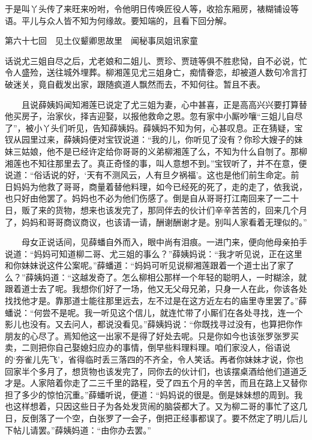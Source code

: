于是叫丫头传了来旺来吩咐，令他明日传唤匠役人等，收拾东厢房，裱糊铺设等语。平儿与众人皆不知为何缘故。要知端的，且看下回分解。


第六十七回　见土仪颦卿思故里　闻秘事凤姐讯家童


话说尤三姐自尽之后，尤老娘和二姐儿、贾珍、贾琏等俱不胜悲恸，自不必说，忙令人盛殓，送往城外埋葬。柳湘莲见尤三姐身亡，痴情眷恋，却被道人数句冷言打破迷关，竟自截发出家，跟随疯道人飘然而去，不知何往。暂且不表。

　　且说薛姨妈闻知湘莲已说定了尤三姐为妻，心中甚喜，正是高高兴兴要打算替他买房子，治家伙，择吉迎娶，以报他救命之恩。忽有家中小厮吵嚷“三姐儿自尽了”，被小丫头们听见，告知薛姨妈。薛姨妈不知为何，心甚叹息。正在猜疑，宝钗从园里过来，薛姨妈便对宝钗说道：“我的儿，你听见了没有？你珍大嫂子的妹妹三姑娘，他不是已经许定给你哥哥的义弟柳湘莲了么，不知为什么自刎了。那柳湘莲也不知往那里去了。真正奇怪的事，叫人意想不到。”宝钗听了，并不在意，便说道：“俗话说的好，‘天有不测风云，人有旦夕祸福’。这也是他们前生命定。前日妈妈为他救了哥哥，商量着替他料理，如今已经死的死了，走的走了，依我说，也只好由他罢了。妈妈也不必为他们伤感了。倒是自从哥哥打江南回来了一二十日，贩了来的货物，想来也该发完了，那同伴去的伙计们辛辛苦苦的，回来几个月了，妈妈和哥哥商议商议，也该请一请，酬谢酬谢才是。别叫人家看着无理似的。”

　　母女正说话间，见薛蟠自外而入，眼中尚有泪痕。一进门来，便向他母亲拍手说道：“妈妈可知道柳二哥、尤三姐的事么？”薛姨妈说：“我才听见说，正在这里和你妹妹说这件公案呢。”薛蟠道：“妈妈可听见说柳湘莲跟着一个道士出了家了么？”薛姨妈道：“这越发奇了。怎么柳相公那样一个年轻的聪明人，一时糊涂，就跟着道士去了呢。我想你们好了一场，他又无父母兄弟，只身一人在此，你该各处找找他才是。靠那道士能往那里远去，左不过是在这方近左右的庙里寺里罢了。”薛蟠说：“何尝不是呢。我一听见这个信儿，就连忙带了小厮们在各处寻找，连一个影儿也没有。又去问人，都说没看见。”薛姨妈说：“你既找寻过没有，也算把你作朋友的心尽了。焉知他这一出家不是得了好处去呢。只是你如今也该张罗张罗买卖，二则把你自己娶媳妇应办的事情，倒早些料理料理。咱们家没人，俗语说的‘夯雀儿先飞’，省得临时丢三落四的不齐全，令人笑话。再者你妹妹才说，你也回家半个多月了，想货物也该发完了，同你去的伙计们，也该摆桌酒给他们道道乏才是。人家陪着你走了二三千里的路程，受了四五个月的辛苦，而且在路上又替你担了多少的惊怕沉重。”薛蟠听说，便道：“妈妈说的很是。倒是妹妹想的周到。我也这样想着，只因这些日子为各处发货闹的脑袋都大了。又为柳二哥的事忙了这几日，反倒落了一个空，白张罗了一会子，倒把正经事都误了。要不然定了明儿后儿下帖儿请罢。”薛姨妈道：“由你办去罢。”

